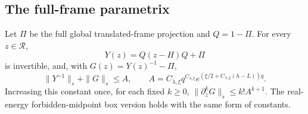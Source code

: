 \subsection{The full-frame parametrix}
\begin{lemma}\label{lem:globalS}
Let $\Pi$ be the full global translated-frame projection and $Q=1-\Pi$. For every $z\in\mathcal R$,
\[
 Y(z)=Q(z-H)Q+\Pi
\]
is invertible, and, with $G(z)=Y(z)^{-1}-\Pi$,
\begin{equation}\label{eq:belowS}
 \|Y^{-1}\|_s+\|G\|_s\le A,\qquad
 A=C_{\lambda,\xi}q^{C_{\lambda,\xi}}
       e^{(\xi/2+C_{\lambda,\xi}(h-L))q}.
\end{equation}
Increasing this constant once, for each fixed $k\ge0$,
$\|\partial_z^kG\|_s\le k!A^{k+1}$. The real-energy forbidden-midpoint box version holds with the same form of constants.
\end{lemma}
